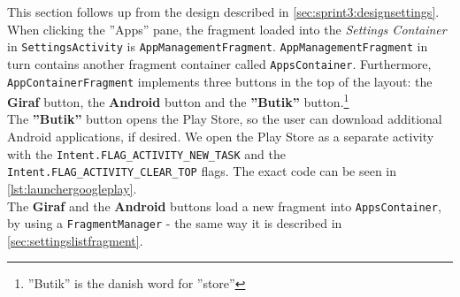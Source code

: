 This section follows up from the design described in \cref{sec:sprint3:designsettings}.
When clicking the ''Apps'' pane, the fragment loaded into the \textit{Settings Container} in \lstinline!SettingsActivity! is \lstinline!AppManagementFragment!.
\lstinline!AppManagementFragment! in turn contains another fragment container called \lstinline!AppsContainer!.
Furthermore, \lstinline!AppContainerFragment! implements three buttons in the top of the layout: the \textbf{Giraf} button, the \textbf{Android} button and the \textbf{''Butik''} button.\footnote{''Butik'' is the danish word for ''store''}\\


The \textbf{''Butik''} button opens the  Play Store, so the user can download additional Android applications, if desired. 
We open the Play Store as a separate activity with the \lstinline!Intent.FLAG_ACTIVITY_NEW_TASK! and the \lstinline!Intent.FLAG_ACTIVITY_CLEAR_TOP! flags.
The exact code can be seen in \cref{lst:launchergoogleplay}.\\

The \textbf{Giraf} and the \textbf{Android} buttons load a new fragment into \lstinline!AppsContainer!, by using a \lstinline!FragmentManager! - the same way it is described in \cref{sec:settingslistfragment}.\\

